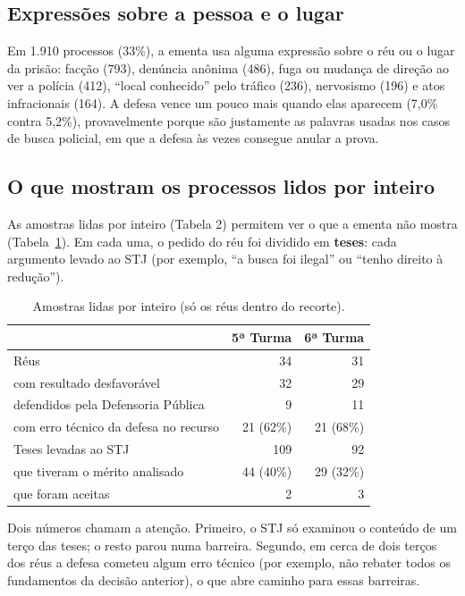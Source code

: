 \subsection*{Expressões sobre a pessoa e o lugar}

Em 1.910 processos (33\%), a ementa usa alguma expressão sobre o réu ou o lugar da prisão:
facção (793), denúncia anônima (486), fuga ou mudança de direção ao ver a polícia (412),
``local conhecido'' pelo tráfico (236), nervosismo (196) e atos infracionais (164). A defesa
vence um pouco mais quando elas aparecem (7,0\% contra 5,2\%), provavelmente porque são
justamente as palavras usadas nos casos de busca policial, em que a defesa às vezes consegue
anular a prova.

\subsection*{O que mostram os processos lidos por inteiro}

As amostras lidas por inteiro (Tabela 2) permitem ver o que a ementa não mostra
(Tabela~\ref{tab:dados-amostras}). Em cada uma, o pedido do réu foi dividido em
\textbf{teses}: cada argumento levado ao STJ (por exemplo, ``a busca foi ilegal'' ou ``tenho
direito à redução'').

\begin{table}[h]
\centering\small
\caption{Amostras lidas por inteiro (só os réus dentro do recorte).}
\label{tab:dados-amostras}
\begin{tabular}{lrr}
\toprule
 & 5ª Turma & 6ª Turma \\
\midrule
Réus & 34 & 31 \\
\quad com resultado desfavorável & 32 & 29 \\
\quad defendidos pela Defensoria Pública & 9 & 11 \\
\quad com erro técnico da defesa no recurso & 21 (62\%) & 21 (68\%) \\
Teses levadas ao STJ & 109 & 92 \\
\quad que tiveram o mérito analisado & 44 (40\%) & 29 (32\%) \\
\quad que foram aceitas & 2 & 3 \\
\bottomrule
\end{tabular}
\end{table}

Dois números chamam a atenção. Primeiro, o STJ só examinou o conteúdo de um terço das
teses; o resto parou numa barreira. Segundo, em cerca de dois terços dos réus a defesa
cometeu algum erro técnico (por exemplo, não rebater todos os fundamentos da decisão
anterior), o que abre caminho para essas barreiras.

